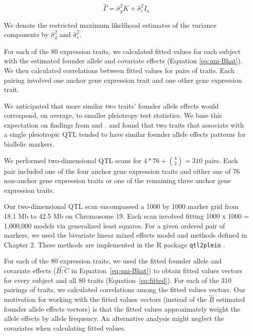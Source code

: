 \documentclass[oneside]{book}
\begin{document}
\begin{equation}\label{eq:Sigma}
\hat \Gamma = \hat\sigma_g^2 K + \hat \sigma_e^2 I_n
\end{equation}

\noindent We denote the restricted maximum likelihood estimates of the variance components by $\hat \sigma_g^2$ and $\hat \sigma_e^2$.


For each of the 80 expression traits, we calculated fitted values for each subject with the estimated founder allele and covariate effects (Equation \ref{eq:uni-Bhat}). We then calculated correlations between fitted values for pairs of traits. Each pairing involved one anchor gene expression trait and one other gene expression trait.

We anticipated that more similar two traits' founder allele effects would correspond, on average, to smaller pleiotropy test statistics. We base this expectation on findings from \citet{macdonald2007joint} and \citet{king2012genetic}. \citet{macdonald2007joint} and \citet{king2012genetic} found that two traits that associate with a single pleiotropic QTL tended to have similar founder allele effects patterns for biallelic markers.

We performed two-dimensional QTL scans for $4 * 76 + \binom{4}{2} = 310$ pairs. Each pair included one of the four anchor gene expression traits and either one of 76 non-anchor gene expression traits or one of the remaining three anchor gene expression traits.

Our two-dimensional QTL scan encompassed a 1000 by 1000 marker grid from 18.1 Mb to 42.5 Mb on Chromosome 19. Each scan involved fitting 1000 x 1000 = 1,000,000 models via generalized least squares. For a given ordered pair of markers, we used the bivariate linear mixed effects model and methods defined in Chapter 2. These methods are implemented in the R package \texttt{qtl2pleio} \citep{qtl2pleio}.

For each of the 80 expression traits, we used the fitted founder allele and covariate effects ($\widehat{B:C}$ in Equation~\ref{eq:uni-Bhat}) to obtain fitted values vectors for every subject and all 80 traits (Equation~\ref{eq:fitted}). For each of the 310 pairings of traits, we calculated correlations among the fitted values vectors. Our motivation for working with the fitted values vectors (instead of the $\hat B$ estimated founder allele effects vectors) is that the fitted values approximately weight the allele effects by allele frequency. An alternative analysis might neglect the covariates when calculating fitted values.
\end{document}
